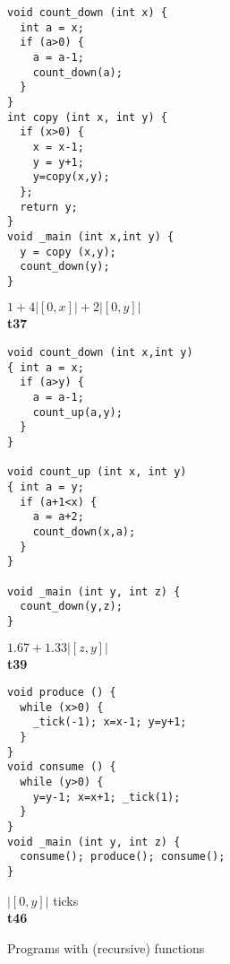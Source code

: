 \documentclass[nocopyrightspace,preprint]{sigplanconf}
\begin{document}
\begin{figure*}[t!]
 \setlength{\progwidth}{.28\linewidth}
  \centering
%
%
  \begin{minipage}[b]{\progwidth}
    \begin{center}
   \begin{lstlisting}
void count_down (int x) {
  int a = x;
  if (a>0) {
    a = a-1;
    count_down(a);
  }
}
int copy (int x, int y) {
  if (x>0) {
    x = x-1;
    y = y+1;
    y=copy(x,y);
  };
  return y;
}
void _main (int x,int y) {
  y = copy (x,y);
  count_down(y);
}
   \end{lstlisting}

$1 + 4|[0, x]| + 2|[0, y]|$
\\[.7\baselineskip]
      {\bf t37}
    \end{center}
  \end{minipage}
%
%
  \begin{minipage}[b]{\progwidth}
    \begin{center}
   \begin{lstlisting}
void count_down (int x,int y)
{ int a = x;
  if (a>y) {
    a = a-1;
    count_up(a,y);
  }
}

void count_up (int x, int y)
{ int a = y;
  if (a+1<x) {
    a = a+2;
    count_down(x,a);
  }
}

void _main (int y, int z) {
  count_down(y,z);
}
   \end{lstlisting}

$1.67 + 1.33 |[z,y]|$
\\[.7\baselineskip]
      {\bf t39}
    \end{center}
  \end{minipage}
%
%
  \begin{minipage}[b]{\progwidth}
    \begin{center}
   \begin{lstlisting}
void produce () {
  while (x>0) {
    _tick(-1); x=x-1; y=y+1;
  }
}
void consume () {
  while (y>0) {
    y=y-1; x=x+1; _tick(1);
  }
}
void _main (int y, int z) {
  consume(); produce(); consume();
}
   \end{lstlisting}

$|[0, y]|$ ticks
\\[.7\baselineskip]
      {\bf t46}
    \end{center}
  \end{minipage}

   \caption{Programs with (recursive) functions}
  \label{fig:cat3}
\end{figure*}
\end{document}
